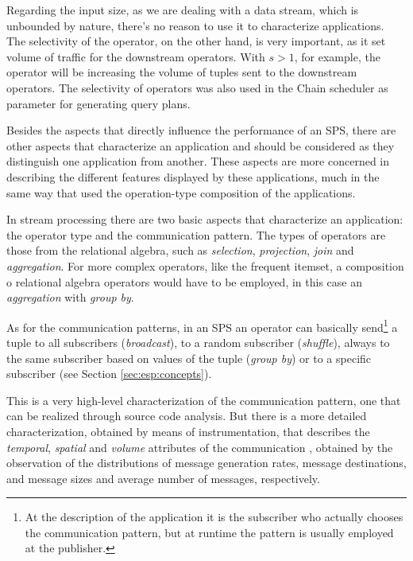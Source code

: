 \documentclass[ppgc,diss,english]{iiufrgs}
\begin{document}
Regarding the input size, as we are dealing with a data stream, which is unbounded by nature, there's no reason to use it to characterize applications. The selectivity of the operator, on the other hand, is very important, as it set volume of traffic for the downstream operators. With $s > 1$, for example, the operator will be increasing the volume of tuples sent to the downstream operators. The selectivity of operators was also used in the Chain scheduler \cite{babcock2003chain} as parameter for generating query plans.



Besides the aspects that directly influence the performance of an SPS, there are other aspects that characterize an application and should be considered as they distinguish one application from another. These aspects are more concerned in describing the different features displayed by these applications, much in the same way that \cite{balaprakash2013exascale} used the operation-type composition of the applications.

In stream processing there are two basic aspects that characterize an application: the operator type and the communication pattern. The types of operators are those from the relational algebra, such as \emph{selection}, \emph{projection}, \emph{join} and \emph{aggregation}. For more complex operators, like the frequent itemset, a composition o relational algebra operators would have to be employed, in this case an \emph{aggregation} with \emph{group by}.

As for the communication patterns, in an SPS an operator can basically send\footnote{At the description of the application it is the subscriber who actually chooses the communication pattern, but at runtime the pattern is usually employed at the publisher.} a tuple to all subscribers (\emph{broadcast}), to a random subscriber (\emph{shuffle}), always to the same subscriber based on values of the tuple (\emph{group by}) or to a specific subscriber (see Section \ref{sec:esp:concepts}).

This is a very high-level characterization of the communication pattern, one that can be realized through source code analysis. But there is a more detailed characterization, obtained by means of instrumentation, that describes the \emph{temporal}, \emph{spatial} and \emph{volume} attributes of the communication \cite{kim1998characterization}, obtained by the observation of the distributions of message generation rates, message destinations, and message sizes and average number of messages, respectively.
\end{document}
